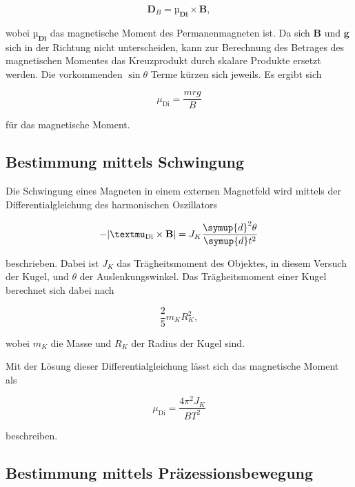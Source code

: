 \begin{equation}
    \label{eqn:dreh-magn}
    \mathbf{D}_B = \mathbf{µ_\text{Di}} \times \mathbf{B},
\end{equation}

wobei $\mathbf{µ_\text{Di}}$ das magnetische Moment des Permanenmagneten ist.
Da sich $\mathbf{B}$ und $\mathbf{g}$ sich in der Richtung nicht unterscheiden, kann zur Berechnung des Betrages des magnetischen Momentes das Kreuzprodukt durch skalare Produkte ersetzt werden. Die vorkommenden $\sin \theta$ Terme kürzen sich jeweils.
Es ergibt sich 

\begin{equation}
    \label{eqn:magn-grav}
    \mu_\text{Di} = \frac{m r g}{B}
\end{equation}

für das magnetische Moment.


\subsection{Bestimmung mittels Schwingung}

Die Schwingung eines Magneten in einem externen Magnetfeld wird mittels der Differentialgleichung des harmonischen Oszillators

\begin{equation}
    \label{eqn:harm-osz}
    -|\mathbf{µ}_\text{Di} \times \mathbf{B}| = J_K \frac{\symup{d}^2 \theta}{\symup{d}t^2}
\end{equation}

beschrieben. Dabei ist $J_K$ das Trägheitsmoment des Objektes, in diesem Versuch der Kugel, und $\theta$ der Auslenkungswinkel.
Das Trägheitsmoment einer Kugel berechnet sich dabei nach

\begin{equation}
    \frac{2}{5} m_K R_K^2, 
\end{equation}

wobei $m_K$ die Masse und $R_K$ der Radius der Kugel sind.

Mit der Lösung dieser Differentialgleichung lässt sich das magnetische Moment als

\begin{equation}
    \label{eqn:magn-schwing}
    \mu_\text{Di} = \frac{4 \pi^2 J_K}{B T^2}
\end{equation}

beschreiben.


\subsection{Bestimmung mittels Präzessionsbewegung}

